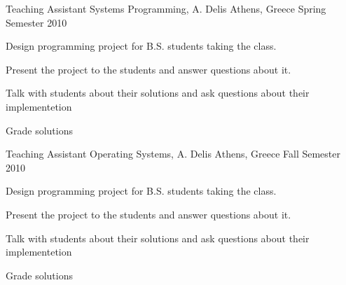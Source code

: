 \begin{cventries}
  \cventry
    {Teaching Assistant} %
    {Systems Programming, A. Delis} %
    {Athens, Greece} %
    {Spring Semester 2010} %
    {
      \begin{cvitems} %
        \item {Design programming project for B.S. students taking the class.}
        \item {Present the project to the students and answer questions about it.}
        \item {Talk with students about their solutions and ask questions about their implementetion}
		\item {Grade solutions}
      \end{cvitems}
    }

  \cventry
    {Teaching Assistant} %
    {Operating Systems, A. Delis} %
    {Athens, Greece} %
    {Fall Semester 2010} %
    {
      \begin{cvitems} %
        \item {Design programming project for B.S. students taking the class.}
        \item {Present the project to the students and answer questions about it.}
        \item {Talk with students about their solutions and ask questions about their implementetion}
		\item {Grade solutions}
      \end{cvitems}
    }

\end{cventries}
